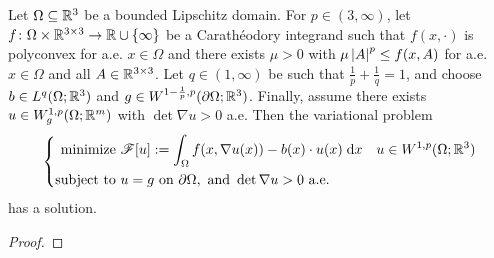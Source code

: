 \begin{theorem}
    Let $\Omega \subseteq \mathbb{R}^3$ be a bounded Lipschitz domain. For $p \in (3,\infty)$, let $f \colon \Omega \times \mathbb{R}^{3 \times 3} \to \mathbb{R} \cup \left\{ {\infty} \right\}$ be a Carath\'eodory integrand such that $f(x,\cdot)$ is polyconvex for a.e. $x \in \Omega$ and there exists $\mu > 0$ with $\mu\left\lvert {A} \right\rvert^p \leq f(x,A)$ for a.e. $x \in \Omega$ and all $A \in \mathbb{R}^{3 \times 3}$. Let $q \in (1,\infty)$ be such that $\frac{1}{p} + \frac{1}{q} = 1$, and choose $b \in L^q(\Omega;\mathbb{R}^3)$ and $g \in W^{1-\frac{1}{p},p}(\partial\Omega;\mathbb{R}^3)$. Finally, assume there exists $u \in W^{1,p}_g(\Omega;\mathbb{R}^m)$ with $\det{\nabla u} > 0$ a.e. Then the variational problem
    \begin{equation} 
        \left\{ \begin{aligned}
            \text{minimize } & \mathscr{F}[u] := \int_\Omega f(x,\nabla u(x)) - b(x) \cdot u(x) \; \mathrm{d}{x} \quad u \in W^{1,p}(\Omega;\mathbb{R}^3) \\
            \text{subject to } & u = g \text{ on } \partial\Omega, \text{ and } \det{\nabla u} > 0 \text{ a.e.}
        \end{aligned} \right.
    \end{equation}
    has a solution.
\end{theorem}
\begin{proof}

\end{proof}